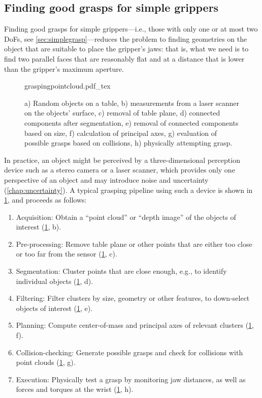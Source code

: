\subsection{Finding good grasps for simple grippers}

Finding good grasps for simple grippers---i.e., those with only one or at most two DoFs, see \cref{sec:simplegrasp}---reduces the problem to finding geometries on the object that are suitable to place the gripper's jaws: that is, what we need is to find two parallel faces that are reasonably flat and at a distance that is lower than the gripper's maximum aperture.
\begin{figure}
    \def\svgwidth{\textwidth}
    {graspingpointcloud.pdf_tex}
    \caption{a) Random objects on a table, b) measurements from a laser scanner on the objects' surface, c) removal of table plane, d) connected components after segmentation, e) removal of connected components based on size, f) calculation of principal axes, g) evaluation of possible grasps based on collisions, h) physically attempting grasp.\label{fig:graspalgorithm}}
\end{figure}
In practice, an object might be perceived by a three-dimensional perception device such as a stereo camera or a laser scanner, which provides only one perspective of an object and may introduce noise and uncertainty (\cref{chap:uncertainty}). A typical grasping pipeline using such a device is shown in \cref{fig:graspalgorithm}, and proceeds as follows:
\begin{enumerate}
\item Acquisition: Obtain a ``point cloud'' or ``depth image'' of the objects of interest (\cref{fig:graspalgorithm}, b).
\item Pre-processing: Remove table plane or other points that are either too close or too far from the sensor (\cref{fig:graspalgorithm}, c).
\item Segmentation: Cluster points that are close enough, e.g., to identify individual objects (\cref{fig:graspalgorithm}, d).
\item Filtering: Filter clusters by size, geometry or other features, to down-select objects of interest (\cref{fig:graspalgorithm}, e).
\item Planning: Compute center-of-mass and principal axes of relevant clusters (\cref{fig:graspalgorithm}, f).
\item Collision-checking: Generate possible grasps and check for collisions with point clouds (\cref{fig:graspalgorithm}, g).
\item Execution: Physically test a grasp by monitoring jaw distances, as well as forces and torques at the wrist (\cref{fig:graspalgorithm}, h).
\end{enumerate}

